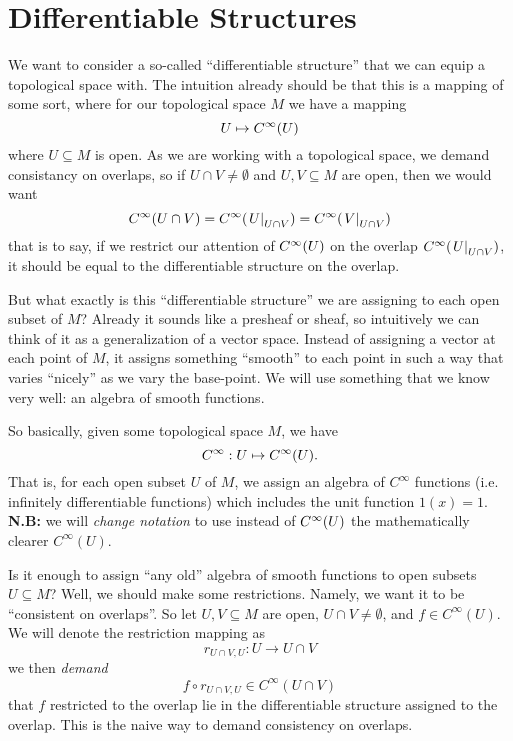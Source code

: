 \section{Differentiable Structures}

We want to consider a so-called ``differentiable structure'' that
we can equip a topological space with. The intuition already
should be that this is a mapping of some sort, where for our
topological space $M$ we have a mapping
\begin{equation}
U\mapsto \diff(U)
\end{equation}
where $U\subseteq M$ is open. As we are working with a
topological space, we demand consistancy on overlaps, so if
$U\cap V\not=\emptyset$ and $U,V\subseteq M$ are open, then we
would want
\begin{equation}
\diff(U\cap V)=\diff(\left.U\right|_{U\cap V})=\diff(\left.V\right|_{U\cap V})
\end{equation}
that is to say, if we restrict our attention of $\diff(U)$ on the overlap
$\diff(\left.U\right|_{U\cap V})$, it should be equal to the
differentiable structure on the overlap. 

But what exactly is this ``differentiable structure'' we are
assigning to each open subset of $M$? Already it sounds like a
presheaf or sheaf, so intuitively we can think of it as a
generalization of a vector space. Instead of assigning a vector
at each point of $M$, it assigns something ``smooth'' to each
point in such a way that varies ``nicely'' as we vary the
base-point. We will use something that we know very well: an
algebra of smooth functions.

So basically, given some topological space $M$, we have
\begin{equation}
\diff:U\mapsto C^{\infty}(U).
\end{equation}
That is, for each open subset $U$ of $M$, we assign an algebra of
$C^{\infty}$ functions (i.e. infinitely differentiable functions)
which includes the unit function $1(x)=1$. \textbf{N.B:} we will
\emph{change notation} to use instead of $\diff(U)$ the
mathematically clearer $C^{\infty}(U)$.\def\diff{C^{\infty}}

Is it enough to assign ``any old'' algebra of smooth functions to
open subsets $U\subseteq M$? Well, we should make some
restrictions. Namely, we want it to be ``consistent on
overlaps''. So let $U,V\subseteq M$ are open, $U\cap
V\not=\emptyset$, and $f\in\diff(U)$. We will denote the
restriction mapping as 
\begin{equation}
r_{U\cap V,U}:U\to U\cap V
\end{equation}
we then \emph{demand}
\begin{equation}
f\circ r_{U\cap V,U}\in\diff(U\cap V)
\end{equation}
that $f$ restricted to the overlap lie in the differentiable
structure assigned to the overlap. This is the naive way to
demand consistency on overlaps.

